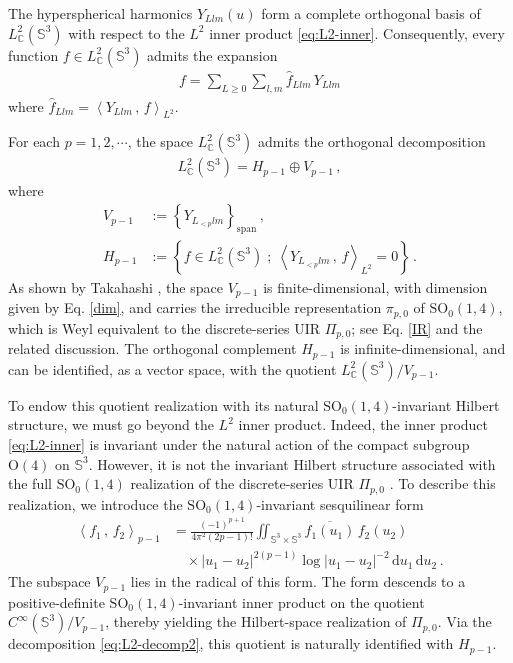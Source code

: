 \documentclass[aps,twocolumn,nofootinbib]{revtex4}
\begin{document}
The hyperspherical harmonics ${Y_{Llm}}(u)$ form a complete orthogonal basis of $L^2_{\mathbb C}({\mathbb{S}}^3)$ with respect to the $L^2$ inner product \eqref{eq:L2-inner}. Consequently, every function $f\in L^2_{\mathbb C}({\mathbb{S}}^3)$ admits the expansion
\begin{align}
    f = \sum_{L\geqslant 0} \sum_{l,m} \hat{f}_{Llm}\,Y_{Llm}
\end{align}
where $\hat{f}_{Llm} = \left\langle Y_{Llm}\,,\,f\right\rangle^{}_{L^2}$.

For each $p=1,2,\cdots$, the space $L^2_{\mathbb C}({\mathbb{S}}^3)$ admits the orthogonal decomposition
\begin{align}\label{eq:L2-decomp2}
    L^2_{\mathbb{C}}(\mathbb{S}^3) = H_{p-1}\oplus V_{p-1}\,,
\end{align}
where 
\begin{align}
    V_{p-1} &:= \left\{Y_{L^{}_{<p}lm}\right\}_{\mathrm{span}}\,, \label{eq:Vp-1-def}\\[3pt]
     H_{p-1}  &:= \left\{f\in L^2_{\mathbb{C}}(\mathbb{S}^3)\;;\;\left\langle Y_{L^{}_{<p}lm}\,,\,f\right\rangle^{}_{L^2} = 0\right\} \,. \label{eq:Hp-1-def}
\end{align}
As shown by Takahashi \cite{Takahashi}, the space $V_{p-1}$ is finite-dimensional, with dimension given by Eq. \eqref{dim}, and carries the irreducible representation $\pi_{p,0}$ of $\mathrm{SO}_0(1,4)$, which is Weyl equivalent to the discrete-series UIR $\Pi_{p,0}$; see Eq. \eqref{IR} and the related discussion. The orthogonal complement $H_{p-1}$ is infinite-dimensional, and can be identified, as a vector space, with the quotient $L^2_{\mathbb C}({\mathbb{S}}^3)/V_{p-1}$.

To endow this quotient realization with its natural $\mathrm{SO}_0(1,4)$-invariant Hilbert structure, we must go beyond the $L^2$ inner product. Indeed, the inner product \eqref{eq:L2-inner} is invariant under the natural action of the compact subgroup $\mathrm O(4)$ on ${\mathbb{S}}^3$. However, it is not the invariant Hilbert structure associated with the full $\mathrm{SO}_0(1,4)$ realization of the discrete-series UIR $\Pi_{p,0}$ \cite{Takahashi}. To describe this realization, we introduce the $\mathrm{SO}_0(1,4)$-invariant sesquilinear form \cite{Takahashi}
\begin{align}\label{eq:Hp-1-inner}
    \left\langle f_1\,,\, f_2 \right\rangle_{p-1} &= \frac{(-1)^{p+1}}{4\pi^2(2p-1)!} \iint_{\mathbb{S}^3\times\mathbb{S}^3} \overline{f_1(u_1)}\,f_2(u_2) \nonumber\\[3pt]
    &\quad\times|u_1-u_2|^{2(p-1)}\log|u_1-u_2|^{-2}\,\mathrm{d}u_1\,\mathrm{d}u_2\,.
\end{align}
The subspace $V_{p-1}$ lies in the radical of this form. The form descends to a positive-definite $\mathrm{SO}_0(1,4)$-invariant inner product on the quotient $C^\infty({\mathbb{S}}^3)/V_{p-1}$, thereby yielding the Hilbert-space realization of $\Pi_{p,0}$. Via the decomposition \eqref{eq:L2-decomp2}, this quotient is naturally identified with $H_{p-1}$.
\end{document}
